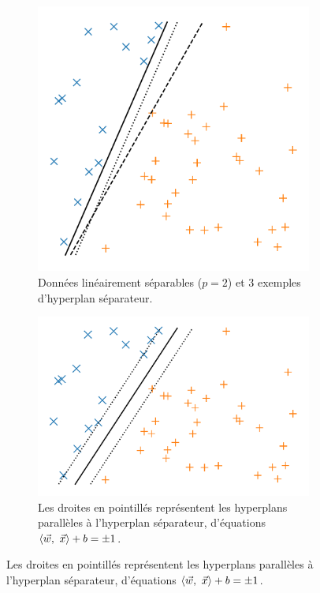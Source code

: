 \documentclass[french,11pt]{article}
\begin{document}
\begin{figure}[h]
  \begin{subfigure}[t]{0.45\textwidth}
    \centering
    \includegraphics[width=\textwidth]{figures/linearly_separable}  
    \caption{Données linéairement séparables ($p=2$) et 3 exemples d'hyperplan
      séparateur.}
    \label{fig:linearly_separable}
  \end{subfigure} \hfill
  \begin{subfigure}[t]{0.45\textwidth}
    \centering
    \includegraphics[width=\textwidth]{figures/margin}  
    \caption{Les droites en pointillés représentent les hyperplans parallèles à
      l'hyperplan séparateur, d'équations $\innerproduct{\ww,~\xx} + b = \pm 1$.}
    \label{fig:margin}
  \end{subfigure} 
\end{figure}
\end{document}
